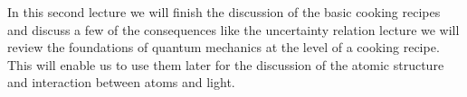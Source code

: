 In this second lecture we will finish the discussion of the basic cooking recipes and discuss a few of the consequences like the uncertainty relation lecture we will review the foundations of quantum mechanics at the level of a cooking recipe. This will enable us to use them later for the discussion of the atomic structure and interaction between atoms and light.